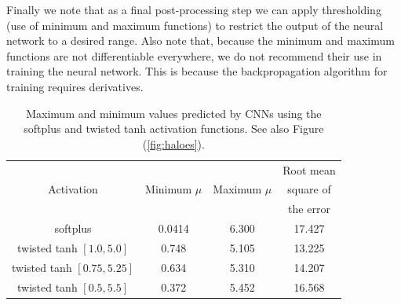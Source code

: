 \documentclass[12pt]{article}
\begin{document}
Finally we note that as a final post-processing step we can apply thresholding (use of minimum and maximum functions) to restrict the output of the neural network to a desired range. Also note that, because the minimum and maximum functions are not differentiable everywhere, we do not recommend their use in training the neural network. This is because the backpropagation algorithm for training requires derivatives.
%
\begin{table}
  \centering
  \begin{tabular}{|c|c|c|c|}
    \hline
    \multirow{3}{*}{Activation}  & \multirow{3}{*}{Minimum $\mu$} & \multirow{3}{*}{Maximum $\mu$} & Root mean \\
                                 &                                &                                & square of \\
                                 &                                &                                & the error \\ 
    \hline
    softplus                 & 0.0414       & 6.300          & 17.427\\
    \hline
    twisted tanh $[1.0, 5.0]$  & 0.748        & 5.105          & 13.225\\
    \hline
    twisted tanh $[0.75,5.25]$ & 0.634        & 5.310          & 14.207\\
    \hline
    twisted tanh $[0.5, 5.5]$  & 0.372        & 5.452          & 16.568\\ 
    \hline
  \end{tabular}
  \caption{\label{table:muminmax} Maximum and minimum values predicted by CNNs using the softplus and twisted tanh activation functions. See also Figure (\ref{fig:haloes}).}
\end{table}
\end{document}
